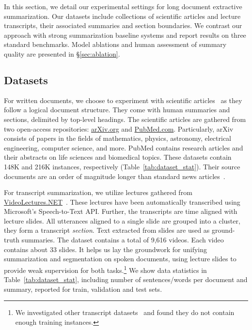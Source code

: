 \documentclass[11pt]{article}
\begin{document}
In this section, we detail our experimental settings for long document extractive summarization.
Our datasets include collections of scientific articles and lecture transcripts, 
their associated summaries and section boundaries. 
We contrast our approach with strong summarization baseline systems and report results on three standard benchmarks.
Model ablations and human assessment of summary quality are presented in \S\ref{sec:ablation}. 


\subsection{Datasets}

For written documents, we choose to experiment with scientific articles~\cite{cohan-etal-2018-discourse} as they follow a logical document structure.
They come with human summaries and sections, delimited by top-level headings.
The scientific articles are gathered from two open-access repositories: \href{arXiv.org}{arXiv.org} and \href{PubMed.com}{PubMed.com}.
Particularly, arXiv consists of papers in the fields of mathematics, physics, astronomy, electrical engineering, computer science, and more.
PubMed contains research articles and their abstracts on life sciences and biomedical topics.
These datasets contain 148K and 216K instances, respectively (Table~\ref{tab:dataset_stat}). 
Their source documents are an order of magnitude longer than standard news articles~\cite{grusky-etal-2018-newsroom}.


For transcript summarization, we utilize lectures gathered from \href{VideoLectures.NET}{VideoLectures.NET}~\cite{lv2021vt}.
These lectures have been automatically transcribed using Microsoft's Speech-to-Text API. 
Further, the transcripts are time aligned with lecture slides.
All utterances aligned to a single slide are grouped into a cluster, they form a transcript \emph{section}.
Text extracted from slides are used as ground-truth summaries. 
The dataset contains a total of 9,616 videos.
Each video contains about 33 slides.
It helps us lay the groundwork for unifying summarization and segmentation on spoken documents, 
using lecture slides to provide weak supervision for both tasks.\footnote{
We investigated other transcript datasets~\cite{Carletta:2006} and found they do not contain enough training instances.
}
We show data statistics in Table~\ref{tab:dataset_stat},
including number of sentences/words per document and summary,
reported for train, validation and test sets.
\end{document}
